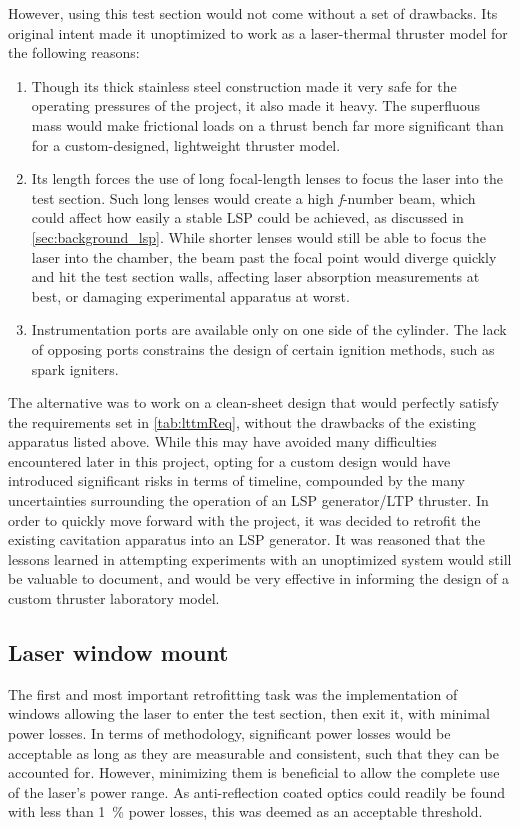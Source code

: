             However, using this test section would not come without a set of drawbacks. Its original intent made it unoptimized to work as a laser-thermal thruster model for the following reasons:
            \begin{enumerate}
                \item Though its thick stainless steel construction made it very safe for the operating pressures of the project, it also made it heavy. The superfluous mass would make frictional loads on a thrust bench far more significant than for a custom-designed, lightweight thruster model.
                \item Its length forces the use of long focal-length lenses to focus the laser into the test section. Such long lenses would create a high {\itshape f}-number beam, which could affect how easily a stable LSP could be achieved, as discussed in \autoref{sec:background_lsp}. While shorter lenses would still be able to focus the laser into the chamber, the beam past the focal point would diverge quickly and hit the test section walls, affecting laser absorption measurements at best, or damaging experimental apparatus at worst.
                \item Instrumentation ports are available only on one side of the cylinder. The lack of opposing ports constrains the design of certain ignition methods, such as spark igniters.
            \end{enumerate}

            The alternative was to work on a clean-sheet design that would perfectly satisfy the requirements set in \autoref{tab:lttmReq}, without the drawbacks of the existing apparatus listed above. While this may have avoided many difficulties encountered later in this project, opting for a custom design would have introduced significant risks in terms of timeline, compounded by the many uncertainties surrounding the operation of an LSP generator/LTP thruster. In order to quickly move forward with the project, it was decided to retrofit the existing cavitation apparatus into an LSP generator. It was reasoned that the lessons learned in attempting experiments with an unoptimized system would still be valuable to document, and would be very effective in informing the design of a custom thruster laboratory model.

        \subsection{Laser window mount} \label{sec:design_lwm}
            The first and most important retrofitting task was the implementation of windows allowing the laser to enter the test section, then exit it, with minimal power losses. In terms of methodology, significant power losses would be acceptable as long as they are measurable and consistent, such that they can be accounted for. However, minimizing them is beneficial to allow the complete use of the laser's power range. As anti-reflection coated optics could readily be found with less than 1~\% power losses, this was deemed as an acceptable threshold.

